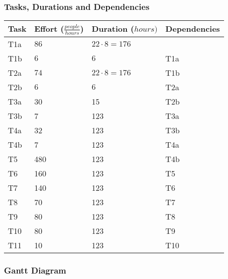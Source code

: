 \subsubsection{Tasks, Durations and Dependencies}
\lipsum[100]
\begin{center}
	\begin{tabulary}{\linewidth\tymin=70pt}{Y{2cm}|Y{3cm}|Y{2cm}|Y{2cm}}
		\textbf{Task} & \textbf{Effort ($\frac{people}{hours}$)} & \textbf{Duration\newline($hours)$} & \textbf{Dependencies} \\ \hline
		T1a &  $86$ & $22 \cdot 8 = 176$  & \\ \hline
		T1b & $6$ & $6$ & T1a \\ \hline
		T2a & $74$ & $22 \cdot 8 = 176$ & T1b \\ \hline
		T2b & $6$ & $6$ & T2a \\ \hline
		T3a & 30 & 15 & T2b \\ \hline
		T3b & 7 & 123 & T3a \\ \hline
		T4a & 32 & 123 & T3b \\ \hline
		T4b & 7 & 123 & T4a \\ \hline
		T5 & 480 & 123 & T4b \\ \hline
		T6 & 160 & 123 & T5 \\ \hline
		T7 & 140 & 123 & T6 \\ \hline
		T8 & 70 & 123 & T7 \\ \hline
		T9 & 80 & 123 & T8 \\ \hline
		T10 & 80 & 123 & T9 \\ \hline
		T11 & 10 & 123 & T10 \\ \hline
	\end{tabulary}
\end{center}
%
\subsubsection{Gantt Diagram}
\lipsum[100]
\begin{center}
	\begin{ganttchart}[hgrid=true, vgrid={*3{white}, dotted}, x unit=1.7mm]{1}{60}
		  \\
		  \\
		 \\
		 \\
		 \\
		 \\
		 \\
	\end{ganttchart}
\end{center}
%